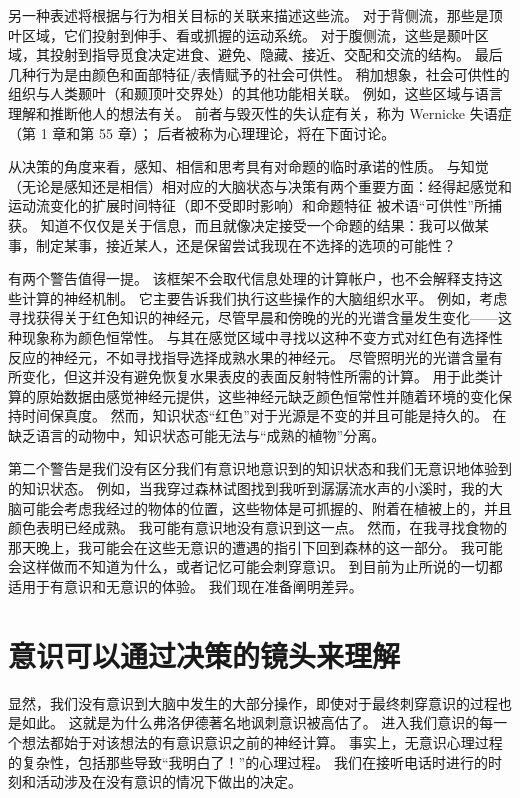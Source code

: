 另一种表述将根据与行为相关目标的关联来描述这些流。 对于背侧流，那些是顶叶区域，它们投射到伸手、看或抓握的运动系统。 对于腹侧流，这些是颞叶区域，其投射到指导觅食决定进食、避免、隐藏、接近、交配和交流的结构。 最后几种行为是由颜色和面部特征/表情赋予的社会可供性。 稍加想象，社会可供性的组织与人类颞叶（和颞顶叶交界处）的其他功能相关联。 例如，这些区域与语言理解和推断他人的想法有关。 前者与毁灭性的失认症有关，称为 Wernicke 失语症（第 1 章和第 55 章）； 后者被称为心理理论，将在下面讨论。

从决策的角度来看，感知、相信和思考具有对命题的临时承诺的性质。 与知觉（无论是感知还是相信）相对应的大脑状态与决策有两个重要方面：经得起感觉和运动流变化的扩展时间特征（即不受即时影响）和命题特征 被术语“可供性”所捕获。 知道不仅仅是关于信息，而且就像决定接受一个命题的结果：我可以做某事，制定某事，接近某人，还是保留尝试我现在不选择的选项的可能性？

有两个警告值得一提。 该框架不会取代信息处理的计算帐户，也不会解释支持这些计算的神经机制。 它主要告诉我们执行这些操作的大脑组织水平。 例如，考虑寻找获得关于红色知识的神经元，尽管早晨和傍晚的光的光谱含量发生变化——这种现象称为颜色恒常性。 与其在感觉区域中寻找以这种不变方式对红色有选择性反应的神经元，不如寻找指导选择成熟水果的神经元。 尽管照明光的光谱含量有所变化，但这并没有避免恢复水果表皮的表面反射特性所需的计算。 用于此类计算的原始数据由感觉神经元提供，这些神经元缺乏颜色恒常性并随着环境的变化保持时间保真度。 然而，知识状态“红色”对于光源是不变的并且可能是持久的。 在缺乏语言的动物中，知识状态可能无法与“成熟的植物”分离。

第二个警告是我们没有区分我们有意识地意识到的知识状态和我们无意识地体验到的知识状态。 例如，当我穿过森林试图找到我听到潺潺流水声的小溪时，我的大脑可能会考虑我经过的物体的位置，这些物体是可抓握的、附着在植被上的，并且颜色表明已经成熟。 我可能有意识地没有意识到这一点。 然而，在我寻找食物的那天晚上，我可能会在这些无意识的遭遇的指引下回到森林的这一部分。 我可能会这样做而不知道为什么，或者记忆可能会刺穿意识。 到目前为止所说的一切都适用于有意识和无意识的体验。 我们现在准备阐明差异。


\section{意识可以通过决策的镜头来理解}
显然，我们没有意识到大脑中发生的大部分操作，即使对于最终刺穿意识的过程也是如此。 这就是为什么弗洛伊德著名地讽刺意识被高估了。 进入我们意识的每一个想法都始于对该想法的有意识意识之前的神经计算。 事实上，无意识心理过程的复杂性，包括那些导致“我明白了！”的心理过程。 我们在接听电话时进行的时刻和活动涉及在没有意识的情况下做出的决定。

